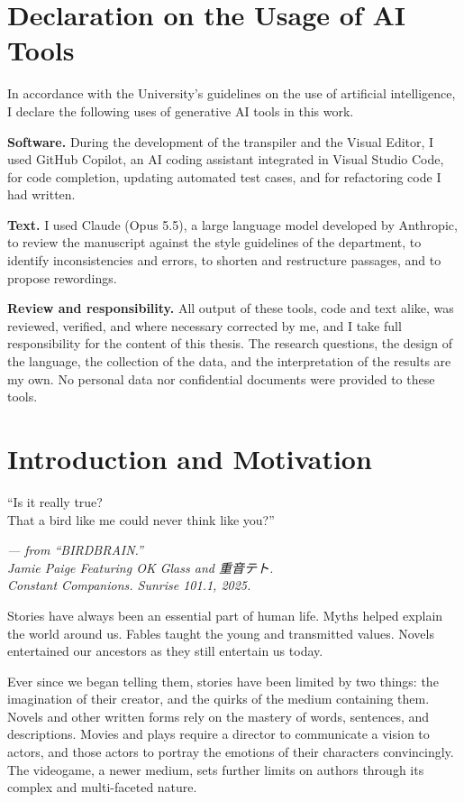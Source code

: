 \chapter*{Declaration on the Usage of AI Tools}

In accordance with the University's guidelines on the use of artificial intelligence, I declare the following uses of generative AI tools in this work.

\textbf{Software.} During the development of the transpiler and the Visual Editor, I used GitHub Copilot, an AI coding assistant integrated in Visual Studio Code, for code completion, updating automated test cases, and for refactoring code I had written.

\textbf{Text.} I used Claude (Opus 5.5), a large language model developed by Anthropic, to review the manuscript against the style guidelines of the department, to identify inconsistencies and errors, to shorten and restructure passages, and to propose rewordings.

\textbf{Review and responsibility.} All output of these tools, code and text alike, was reviewed, verified, and where necessary corrected by me, and I take full responsibility for the content of this thesis. The research questions, the design of the language, the collection of the data, and the interpretation of the results are my own. No personal data nor confidential documents were provided to these tools.

\chapter{Introduction and Motivation}
\label{ch:intro}

\setlength{\epigraphwidth}{0.55\textwidth}
\epigraph{``Is it really true? \\
That a bird like me could never think like you?''}{\textit{--- from ``BIRDBRAIN.'' \\Jamie Paige Featuring OK Glass and 重音テト.\\ Constant Companions. Sunrise 101.1, 2025.}}

Stories have always been an essential part of human life. Myths helped explain the world around us. Fables taught the young and transmitted values. Novels entertained our ancestors as they still entertain us today.
 
Ever since we began telling them, stories have been limited by two things: the imagination of their creator, and the quirks of the medium containing them. Novels and other written forms rely on the mastery of words, sentences, and descriptions. Movies and plays require a director to communicate a vision to actors, and those actors to portray the emotions of their characters convincingly. The videogame, a newer medium, sets further limits on authors through its complex and multi-faceted nature.
 
